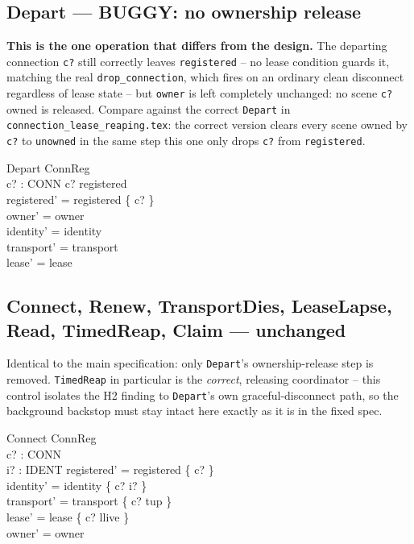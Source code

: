 \documentclass[a4paper,10pt,fleqn]{article}
\begin{document}
\subsection{Depart --- BUGGY: no ownership release}
\label{sec:depart}

\textbf{This is the one operation that differs from the design.} The
departing connection \texttt{c?} still correctly leaves
\texttt{registered} -- no lease condition guards it, matching the real
\texttt{drop\_connection}, which fires on an ordinary clean disconnect
regardless of lease state -- but \texttt{owner} is left completely
unchanged: no scene \texttt{c?} owned is released. Compare against the
correct \texttt{Depart} in \texttt{connection\_lease\_reaping.tex}: the
correct version clears every scene owned by \texttt{c?} to
\texttt{unowned} in the same step this one only drops \texttt{c?} from
\texttt{registered}.

\begin{schema}{Depart}
  \Delta ConnReg \\
  c? : CONN
\where
  c? \in registered \\
  registered' = registered \setminus \{ c? \} \\
  owner' = owner \\
  identity' = identity \\
  transport' = transport \\
  lease' = lease
\end{schema}

\subsection{Connect, Renew, TransportDies, LeaseLapse, Read, TimedReap, Claim --- unchanged}

Identical to the main specification: only \texttt{Depart}'s
ownership-release step is removed. \texttt{TimedReap} in particular is
the \emph{correct}, releasing coordinator -- this control isolates the
H2 finding to \texttt{Depart}'s own graceful-disconnect path, so the
background backstop must stay intact here exactly as it is in the fixed
spec.

\begin{schema}{Connect}
  \Delta ConnReg \\
  c? : CONN \\
  i? : IDENT
\where
  registered' = registered \cup \{ c? \} \\
  identity' = identity \oplus \{ c? \mapsto i? \} \\
  transport' = transport \oplus \{ c? \mapsto tup \} \\
  lease' = lease \oplus \{ c? \mapsto llive \} \\
  owner' = owner
\end{schema}
\end{document}
